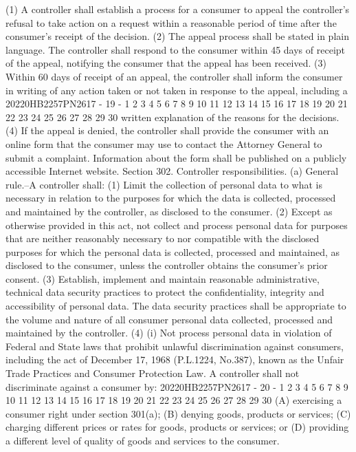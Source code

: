 (1) A controller shall establish a process for a
consumer to appeal the controller's refusal to take action on
a request within a reasonable period of time after the
consumer's receipt of the decision.
(2) The appeal process shall be stated in plain
language. The controller shall respond to the consumer within
45 days of receipt of the appeal, notifying the consumer that
the appeal has been received.
(3) Within 60 days of receipt of an appeal, the
controller shall inform the consumer in writing of any action
taken or not taken in response to the appeal, including a
20220HB2257PN2617 - 19 -
1
2
3
4
5
6
7
8
9
10
11
12
13
14
15
16
17
18
19
20
21
22
23
24
25
26
27
28
29
30
written explanation of the reasons for the decisions.
(4) If the appeal is denied, the controller shall
provide the consumer with an online form that the consumer
may use to contact the Attorney General to submit a
complaint. Information about the form shall be published on a
publicly accessible Internet website.
Section 302. Controller responsibilities.
(a) General rule.--A controller shall:
(1) Limit the collection of personal data to what is
necessary in relation to the purposes for which the data is
collected, processed and maintained by the controller, as
disclosed to the consumer.
(2) Except as otherwise provided in this act, not
collect and process personal data for purposes that are
neither reasonably necessary to nor compatible with the
disclosed purposes for which the personal data is collected,
processed and maintained, as disclosed to the consumer,
unless the controller obtains the consumer's prior consent.
(3) Establish, implement and maintain reasonable
administrative, technical data security practices to protect
the confidentiality, integrity and accessibility of personal
data. The data security practices shall be appropriate to the
volume and nature of all consumer personal data collected,
processed and maintained by the controller.
(4) (i) Not process personal data in violation of
Federal and State laws that prohibit unlawful
discrimination against consumers, including the act of
December 17, 1968 (P.L.1224, No.387), known as the Unfair
Trade Practices and Consumer Protection Law. A controller
shall not discriminate against a consumer by:
20220HB2257PN2617 - 20 -
1
2
3
4
5
6
7
8
9
10
11
12
13
14
15
16
17
18
19
20
21
22
23
24
25
26
27
28
29
30
(A) exercising a consumer right under section
301(a);
(B) denying goods, products or services;
(C) charging different prices or rates for
goods, products or services; or
(D) providing a different level of quality of
goods and services to the consumer.
